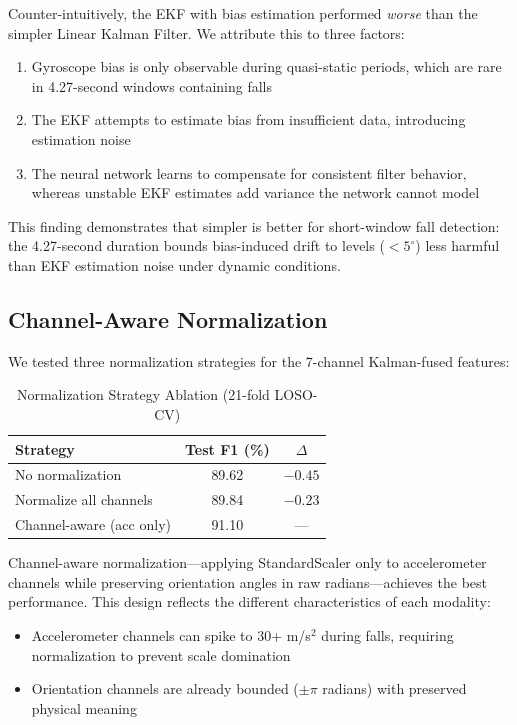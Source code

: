 Counter-intuitively, the EKF with bias estimation performed \textit{worse} than the simpler Linear Kalman Filter. We attribute this to three factors:
\begin{enumerate}
\item Gyroscope bias is only observable during quasi-static periods, which are rare in 4.27-second windows containing falls
\item The EKF attempts to estimate bias from insufficient data, introducing estimation noise
\item The neural network learns to compensate for consistent filter behavior, whereas unstable EKF estimates add variance the network cannot model
\end{enumerate}

This finding demonstrates that simpler is better for short-window fall detection: the 4.27-second duration bounds bias-induced drift to levels ($<5^\circ$) less harmful than EKF estimation noise under dynamic conditions.

\subsection{Channel-Aware Normalization}
\label{sec:channel_aware_norm}

We tested three normalization strategies for the 7-channel Kalman-fused features:

\begin{table}[htbp]
\centering
\caption{Normalization Strategy Ablation (21-fold LOSO-CV)}
\label{tab:norm_ablation}
\begin{tabular}{@{}lcc@{}}
\toprule
\textbf{Strategy} & \textbf{Test F1 (\%)} & \textbf{$\Delta$} \\
\midrule
No normalization & 89.62 & $-0.45$ \\
Normalize all channels & 89.84 & $-0.23$ \\
Channel-aware (acc only) & 91.10 & --- \\
\bottomrule
\end{tabular}
\end{table}

Channel-aware normalization---applying StandardScaler only to accelerometer channels while preserving orientation angles in raw radians---achieves the best performance. This design reflects the different characteristics of each modality:
\begin{itemize}
\item Accelerometer channels can spike to 30+ m/s$^2$ during falls, requiring normalization to prevent scale domination
\item Orientation channels are already bounded ($\pm\pi$ radians) with preserved physical meaning
\end{itemize}

